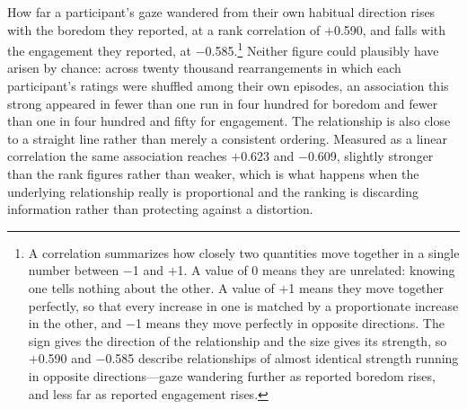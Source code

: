 How far a participant's gaze wandered from their own habitual direction rises with the boredom
they reported, at a rank correlation of $+$0.590, and falls with the engagement they reported,
at $-$0.585.\footnote{A correlation summarizes how closely two quantities move together in a
single number between $-$1 and $+$1. A value of 0 means they are unrelated: knowing one tells
nothing about the other. A value of $+$1 means they move together perfectly, so that every
increase in one is matched by a proportionate increase in the other, and $-$1 means they move
perfectly in opposite directions. The sign gives the direction of the relationship and the size
gives its strength, so $+$0.590 and $-$0.585 describe relationships of almost identical
strength running in opposite directions---gaze wandering further as reported boredom rises, and
less far as reported engagement rises.} Neither figure could plausibly have arisen by chance: across twenty thousand
rearrangements in which each participant's ratings were shuffled among their own episodes, an
association this strong appeared in fewer than one run in four hundred for boredom and fewer
than one in four hundred and fifty for engagement. The relationship is also close to a straight
line rather than merely a consistent ordering. Measured as a linear correlation the same
association reaches $+$0.623 and $-$0.609, slightly stronger than the rank figures rather than
weaker, which is what happens when the underlying relationship really is proportional and the
ranking is discarding information rather than protecting against a distortion.

\begin{center}
\end{center}

